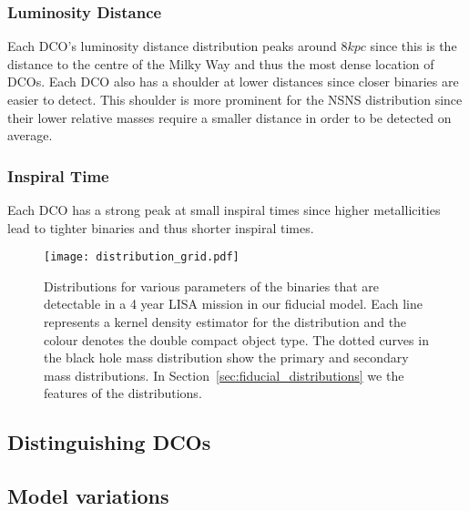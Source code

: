 \subsubsection{Luminosity Distance}
Each DCO's luminosity distance distribution peaks around $8 \unit{kpc}$ since this is the distance to the centre of the Milky Way and thus the most dense location of DCOs. Each DCO also has a shoulder at lower distances since closer binaries are easier to detect. This shoulder is more prominent for the NSNS distribution since their lower relative masses require a smaller distance in order to be detected on average.

\subsubsection{Inspiral Time}
Each DCO has a strong peak at small inspiral times since higher metallicities lead to tighter binaries and thus shorter inspiral times. 

\begin{figure*}[htbp]
    \centering
    \texttt{[image: distribution\_grid.pdf]}
    \caption{Distributions for various parameters of the binaries that are detectable in a 4 year LISA mission in our fiducial model. Each line represents a kernel density estimator for the distribution and the colour denotes the double compact object type. The dotted curves in the black hole mass distribution show the primary and secondary mass distributions. In Section~\ref{sec:fiducial_distributions} we the features of the distributions.}
    \label{fig:fiducial_pdf_distributions}
\end{figure*}

\subsection{Distinguishing DCOs}
\todo{}

\subsection{Model variations}